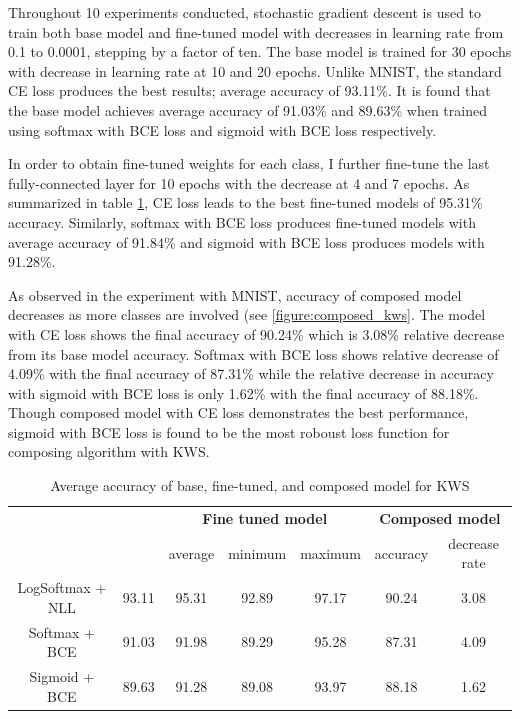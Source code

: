 \documentclass{article}
\begin{document}
Throughout 10 experiments conducted, stochastic gradient descent is used to train both base model and fine-tuned model with decreases in learning rate from 0.1 to 0.0001, stepping by a factor of ten. The base model is trained for 30 epochs with decrease in learning rate at 10 and 20 epochs. Unlike MNIST, the standard CE loss produces the best results; average accuracy of 93.11\%. It is found that the base model achieves average accuracy of 91.03\% and 89.63\% when trained using softmax with BCE loss and sigmoid with BCE loss respectively.

In order to obtain fine-tuned weights for each class, I further fine-tune the last fully-connected layer for 10 epochs with the decrease at 4 and 7 epochs. As summarized in table \ref{table:kws}, CE loss leads to the best fine-tuned models of 95.31\% accuracy. Similarly, softmax with BCE loss produces fine-tuned models with average accuracy of 91.84\% and sigmoid with BCE loss produces models with 91.28\%.

As observed in the experiment with MNIST, accuracy of composed model decreases as more classes are involved (see \ref{figure:composed_kws}. The model with CE loss shows the final accuracy of 90.24\% which is 3.08\% relative decrease from its base model accuracy. Softmax with BCE loss shows relative decrease of 4.09\% with the final accuracy of 87.31\% while the relative decrease in accuracy with sigmoid with BCE loss is only 1.62\% with the final accuracy of 88.18\%. Though composed model with CE loss demonstrates the best performance, sigmoid with BCE loss is found to be the most roboust loss function for composing algorithm with KWS.

\begin{table}[t]
    \centering
    \begin{tabular}{ccccccc}
        \toprule[1pt]
        \multirow{2}{*}{\raisebox{-3\heavyrulewidth}{\bf Loss function}} &
        \multirow{2}{*}{\raisebox{-3\heavyrulewidth}{\bf Base model}} &
        \multicolumn{3}{c}{\bf Fine tuned model } &
        \multicolumn{2}{c}{\bf Composed model } \\
        \cmidrule(lr){3-5}
        \cmidrule(lr){6-7}
        & & average & minimum & maximum & accuracy & decrease rate \\
        \midrule
        LogSoftmax + NLL & 93.11 & 95.31 & 92.89 & 97.17 & 90.24 & 3.08 \\
        Softmax + BCE & 91.03 & 91.98 & 89.29 & 95.28 & 87.31 & 4.09 \\
        Sigmoid + BCE & 89.63 & 91.28 & 89.08 & 93.97 & 88.18 & 1.62 \\
        \bottomrule[1pt]
    \end{tabular}
    \caption{Average accuracy of base, fine-tuned, and composed model for KWS}
    \label{table:kws}
\end{table}
\end{document}
